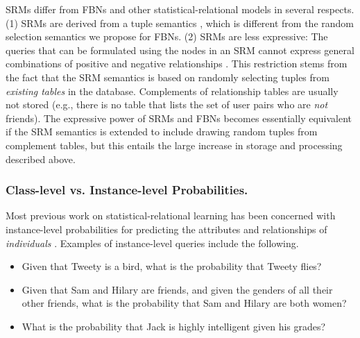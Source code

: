\documentclass[oribibl]{llncs}
\begin{document}
SRMs differ from FBNs and other statistical-relational models in several respects. (1) SRMs are derived from a tuple semantics \cite[Def.6.3]{Getoor2001a}, which is different from the random selection semantics we propose for FBNs.
(2) SRMs are less expressive: The queries that can be formulated  using the nodes in an SRM cannot express general combinations of positive and negative relationships \cite[Def.6.6]{Getoor2001a}. This restriction stems from the fact that the SRM semantics is based on randomly selecting tuples from {\em existing tables} in the database. Complements of relationship tables are usually not stored (e.g., there is no table that lists the set of user pairs who are {\em not} friends). The expressive power of SRMs and FBNs becomes essentially equivalent if the SRM semantics is extended to include drawing random tuples from complement tables, but this
entails the large increase in storage and processing described above.

\subsubsection{Class-level vs. Instance-level Probabilities.}
Most previous work on statistical-relational learning has been concerned with instance-level probabilities for predicting the attributes and relationships of {\em individuals} \cite{getoor-intro,Russell2010}. Examples of instance-level queries include the following.

\begin{itemize}
\item Given that Tweety is a bird, what is the probability that Tweety flies?
\item Given that Sam and Hilary are friends, and given the genders of all their other friends, what is the probability that Sam and Hilary are both women?
\item What is the probability that Jack is highly intelligent given his grades?
\end{itemize}
\end{document}
